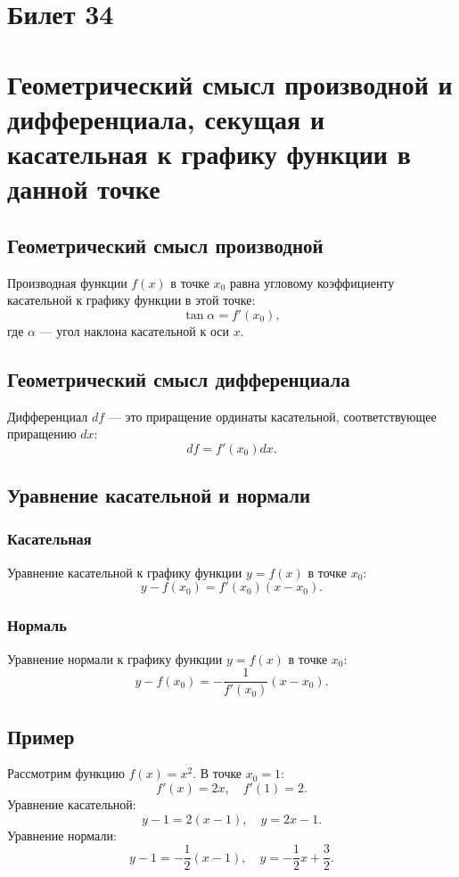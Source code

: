 \documentclass{article}
\begin{document}
\section{Билет 34}

\section*{Геометрический смысл производной и дифференциала, секущая и касательная к графику функции в данной точке}

\subsection{Геометрический смысл производной}
Производная функции \( f(x) \) в точке \( x_0 \) равна угловому коэффициенту касательной к графику функции в этой точке:
\[
\tan \alpha = f'(x_0),
\]
где \( \alpha \) — угол наклона касательной к оси \( x \).

\subsection{Геометрический смысл дифференциала}
Дифференциал \( df \) — это приращение ординаты касательной, соответствующее приращению \( dx \):
\[
df = f'(x_0) dx.
\]

\subsection{Уравнение касательной и нормали}
\subsubsection{Касательная}
Уравнение касательной к графику функции \( y = f(x) \) в точке \( x_0 \):
\[
y - f(x_0) = f'(x_0)(x - x_0).
\]
\subsubsection{Нормаль}
Уравнение нормали к графику функции \( y = f(x) \) в точке \( x_0 \):
\[
y - f(x_0) = -\frac{1}{f'(x_0)}(x - x_0).
\]

\subsection{Пример}
Рассмотрим функцию \( f(x) = x^2 \). В точке \( x_0 = 1 \):
\[
f'(x) = 2x, \quad f'(1) = 2.
\]
Уравнение касательной:
\[
y - 1 = 2(x - 1), \quad y = 2x - 1.
\]
Уравнение нормали:
\[
y - 1 = -\frac{1}{2}(x - 1), \quad y = -\frac{1}{2}x + \frac{3}{2}.
\]
\end{document}
